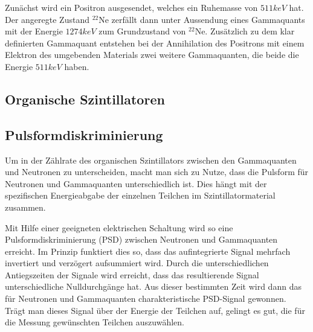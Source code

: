 Zunächst wird ein Positron ausgesendet, welches ein Ruhemasse von $511keV$ hat. Der angeregte Zustand $^{22}$Ne zerfällt dann unter Aussendung eines Gammaquants mit der Energie $1274keV$ zum Grundzustand von $^{22}$Ne. Zusätzlich zu dem klar definierten Gammaquant entstehen bei der Annihilation des Positrons mit einem Elektron des umgebenden Materials zwei weitere Gammaquanten, die beide die Energie $511keV$ haben.

\subsection{Organische Szintillatoren}

\subsection{Pulsformdiskriminierung}
Um in der Zählrate des organischen Szintillators zwischen den Gammaquanten und Neutronen zu unterscheiden, macht man sich zu Nutze, dass die Pulsform für Neutronen und Gammaquanten unterschiedlich ist. Dies hängt mit der spezifischen Energieabgabe der einzelnen Teilchen im Szintillatormaterial zusammen. 

Mit Hilfe einer geeigneten elektrischen Schaltung wird so eine Pulsformdiskriminierung (PSD) zwischen Neutronen und Gammaquanten erreicht. Im Prinzip funktiert dies so, dass das aufintegrierte Signal mehrfach invertiert und verzögert aufsummiert wird. Durch die unterschiedlichen Antiegszeiten der Signale wird erreicht, dass das resultierende Signal unterschiedliche Nulldurchgänge hat. Aus dieser bestimmten Zeit wird dann das für Neutronen und Gammaquanten charakteristische PSD-Signal gewonnen. Trägt man dieses Signal über der Energie der Teilchen auf, gelingt es gut, die für die Messung gewünschten Teilchen auszuwählen.



